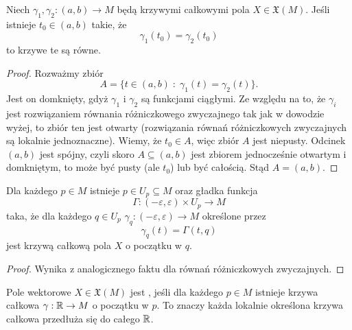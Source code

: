 \begin{remark}\label{jednoznacznosc krzywych calkowych}
  Niech $\gamma_1,\gamma_2:(a,b)\to M$ będą krzywymi całkowymi pola $X\in\mathfrak{X}(M)$. Jeśli istnieje $t_0\in(a,b)$ takie, że 
  $$\gamma_1(t_0)=\gamma_2(t_0)$$
  to krzywe te są równe.
\end{remark}

\begin{proof}
  Rozważmy zbiór
  $$A=\{t\in(a,b)\;:\;\gamma_1(t)=\gamma_2(t)\}.$$
  Jest on domknięty, gdyż $\gamma_1$ i $\gamma_2$ są funkcjami ciągłymi. Ze względu na to, że $\gamma_i$ jest rozwiązaniem równania różniczkowego zwyczajnego tak jak w dowodzie wyżej, to zbiór ten jest otwarty (rozwiązania równań różniczkowych zwyczajnych są lokalnie jednoznaczne). Wiemy, że $t_0\in A$, więc zbiór $A$ jest niepusty. Odcinek $(a,b)$ jest spójny, czyli skoro $A\subseteq(a,b)$ jest zbiorem jednocześnie otwartym i domkniętym, to może być pusty (ale $t_0$) lub być całością. Stąd $A=(a,b)$.
\end{proof}

\begin{fact}\label{gladka zaleznosc od punktu poczatkowego} Dla każdego $p\in M$ istnieje $p\in U_p\subseteq M$ oraz gładka funkcja
  $$\Gamma:(-\varepsilon,\varepsilon)\times U_p\to M$$
  taka, że dla każdego $q\in U_p$ $\gamma_q:(-\varepsilon,\varepsilon)\to M$ określone przez
  $$\gamma_q(t)=\Gamma(t,q)$$
  jest krzywą całkową pola $X$ o początku w $q$.
\end{fact}

\begin{proof}
  Wynika z analogicznego faktu dla równań różniczkowych zwyczajnych.
\end{proof}

\begin{definition}
  Pole wektorowe $X\in\mathfrak{X}(M)$ jest , jeśli dla każdego $p\in M$ istnieje krzywa całkowa $\gamma:\mathbb{R}\to M$ o początku w $p$. To znaczy każda lokalnie określona krzywa całkowa przedłuża się do całego $\mathbb{R}$.
\end{definition}

